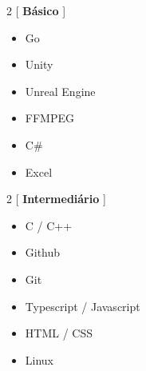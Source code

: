 \documentclass[10pt,a4paper,ragged2e]{altacv}
\begin{document}



{}


\begin{multicols}{2}
[
\textbf{ \Large Básico}
\vspace{-7pt}
]
\begin{itemize}
    \item Go
    \item Unity
    \item Unreal Engine
\end{itemize}
\begin{itemize}
    \item FFMPEG
    \item C\#
    \item Excel
\end{itemize}
\end{multicols}

\begin{multicols}{2}
[
\textbf{ \Large Intermediário}
\vspace{-7pt}
]
\begin{itemize}
    \item C / C++
    \item Github 
    \item Git 
\end{itemize}
\begin{itemize}
    \item Typescript / Javascript
    \item HTML / CSS
    \item Linux
\end{itemize}
\end{multicols}
\end{document}
